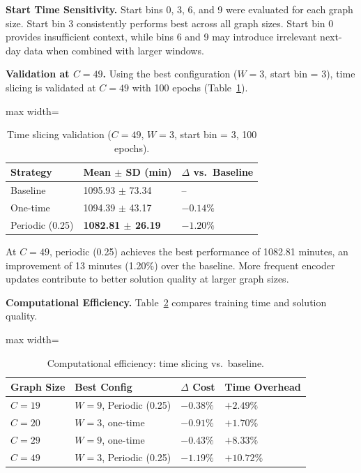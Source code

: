 \textbf{Start Time Sensitivity.} Start bins 0, 3, 6, and 9 were evaluated for each graph size. Start bin 3 consistently
performs best across all graph sizes. Start bin 0 provides insufficient context, while bins
6 and 9 may introduce irrelevant next-day data when combined with larger windows.

\textbf{Validation at $C = 49$.} Using the best configuration ($W = 3$, start bin = 3), time slicing is validated at
$C = 49$ with 100 epochs (Table~\ref{tab:time_slicing_c49}).

\begin{table}[H]
\centering
\caption{Time slicing validation ($C = 49$, $W = 3$, start bin = 3, 100 epochs).}
\label{tab:time_slicing_c49}
\begin{adjustbox}{max width=\textwidth}
\begin{tabular}{lll}
\toprule
\textbf{Strategy} & \textbf{Mean $\pm$ SD (min)} & \textbf{$\Delta$ vs.\ Baseline} \\
\midrule
Baseline        & 1095.93 $\pm$ 73.34 & -- \\
One-time        & 1094.39 $\pm$ 43.17 & $-0.14\%$ \\
Periodic (0.25) & \textbf{1082.81 $\pm$ 26.19} & $-1.20\%$ \\
\bottomrule
\end{tabular}
\end{adjustbox}
\end{table}

At $C = 49$, periodic (0.25) achieves the best performance of 1082.81 minutes, an
improvement of 13 minutes (1.20\%) over the baseline. More frequent encoder updates
contribute to better solution quality at larger graph sizes.

\textbf{Computational Efficiency.} Table~\ref{tab:efficiency} compares training time and solution quality.

\begin{table}[H]
\centering
\caption{Computational efficiency: time slicing vs.\ baseline.}
\label{tab:efficiency}
\begin{adjustbox}{max width=\textwidth}
\begin{tabular}{llll}
\toprule
\textbf{Graph Size} & \textbf{Best Config} & \textbf{$\Delta$ Cost}
    & \textbf{Time Overhead} \\
\midrule
$C = 19$ & $W=9$, Periodic (0.25) & $-0.38\%$ & $+2.49\%$ \\
$C = 20$ & $W=3$, one-time        & $-0.91\%$ & $+1.70\%$ \\
$C = 29$ & $W=9$, one-time        & $-0.43\%$ & $+8.33\%$ \\
$C = 49$ & $W=3$, Periodic (0.25) & $-1.19\%$ & $+10.72\%$ \\
\bottomrule
\end{tabular}
\end{adjustbox}
\end{table}

